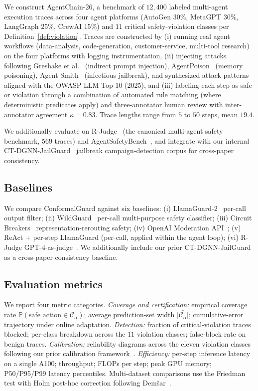 \documentclass[12pt,a4paper]{article}
\theoremstyle{definition}
\theoremstyle{remark}
\newcommand{\modelname}{ConformalGuard}
\newcommand{\benchname}{AgentChain-26}
\providecommand{\Prob}{}\renewcommand{\Prob}{\mathbb{P}}
\newcommand{\Ccal}{\mathcal{C}}
\begin{document}
We construct \benchname{}, a benchmark of $12{,}400$ labeled multi-agent execution traces across four agent platforms (AutoGen $30\%$, MetaGPT $30\%$, LangGraph $25\%$, CrewAI $15\%$) and $11$ critical safety-violation classes per Definition~\ref{def:violation}. Traces are constructed by (i) running real agent workflows (data-analysis, code-generation, customer-service, multi-tool research) on the four platforms with logging instrumentation, (ii) injecting attacks following Greshake et al.~\cite{greshake2023indirect} (indirect prompt injection), AgentPoison~\cite{chen2024agentpoison} (memory poisoning), Agent Smith~\cite{gu2024agentsmith} (infectious jailbreak), and synthesized attack patterns aligned with the OWASP LLM Top 10 (2025), and (iii) labeling each step as safe or violation through a combination of automated rule matching (where deterministic predicates apply) and three-annotator human review with inter-annotator agreement $\kappa = 0.83$. Trace lengths range from $5$ to $50$ steps, mean $19.4$.

We additionally evaluate on R-Judge~\cite{yuan2024rjudge} (the canonical multi-agent safety benchmark, $569$ traces) and AgentSafetyBench~\cite{agentsafetybench2024}, and integrate with our internal CT-DGNN-JailGuard~\cite{anaedevha2026robustidps} jailbreak campaign-detection corpus for cross-paper consistency.

\subsection{Baselines}

We compare \modelname{} against six baselines: (i) LlamaGuard-2~\cite{inan2023llamaguard} per-call output filter; (ii) WildGuard~\cite{han2024wildguard} per-call multi-purpose safety classifier; (iii) Circuit Breakers~\cite{zou2024circuit} representation-rerouting safety; (iv) OpenAI Moderation API~\cite{openai2023moderation}; (v) ReAct + per-step LlamaGuard (per-call, applied within the agent loop); (vi) R-Judge GPT-4-as-judge~\cite{yuan2024rjudge}. We additionally include our prior CT-DGNN-JailGuard~\cite{anaedevha2026robustidps} as a cross-paper consistency baseline.

\subsection{Evaluation metrics}

We report four metric categories. \emph{Coverage and certification:} empirical coverage rate $\Prob(\text{safe action} \in \Ccal_\alpha)$; average prediction-set width $\bar{|\Ccal_\alpha|}$; cumulative-error trajectory under online adaptation. \emph{Detection:} fraction of critical-violation traces blocked; per-class breakdown across the $11$ violation classes; false-block rate on benign traces. \emph{Calibration:} reliability diagrams across the eleven violation classes following our prior calibration framework~\cite{anaedevha2026uchgp}. \emph{Efficiency:} per-step inference latency on a single A100; throughput; FLOPs per step; peak GPU memory; P50/P95/P99 latency percentiles. Multi-dataset comparisons use the Friedman test with Holm post-hoc correction following Dem\v{s}ar~\cite{demsar2006statistical}.
\end{document}
